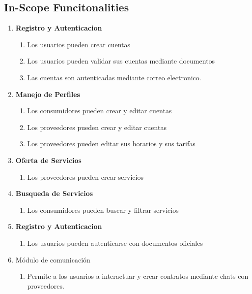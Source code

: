 \documentclass{article}
\begin{document}
  \subsection{In-Scope Funcitonalities}
    \begin{enumerate}
      \item \textbf{Registro y Autenticacion}
        \begin{enumerate}
          \item Los usuarios pueden crear cuentas
          \item Los usuarios pueden validar sus cuentas mediante documentos
          \item Las cuentas son autenticadas mediante correo electronico.
        \end{enumerate}
      \item \textbf{Manejo de Perfiles}
        \begin{enumerate}
          \item Los consumidores pueden crear y editar cuentas
          \item Los proveedores pueden crear  y editar cuentas
          \item Los proveedores pueden editar sus horarios y sus tarifas
        \end{enumerate}
      \item \textbf{Oferta de Servicios}
        \begin{enumerate}
          \item Los proveedores pueden crear servicios
        \end{enumerate}
      \item \textbf{Busqueda de Servicios}
        \begin{enumerate}
          \item Los consumidores pueden buscar y filtrar servicios
        \end{enumerate}
      \item \textbf{Registro y Autenticacion}
        \begin{enumerate}
          \item Los usuarios pueden autenticarse con documentos oficiales
        \end{enumerate}
      \item Módulo de comunicación  
        \begin{enumerate}
          \item Permite a los usuarios a interactuar y crear contratos mediante chats con proveedores. 
        \end{enumerate}

\end{enumerate}
\end{document}
